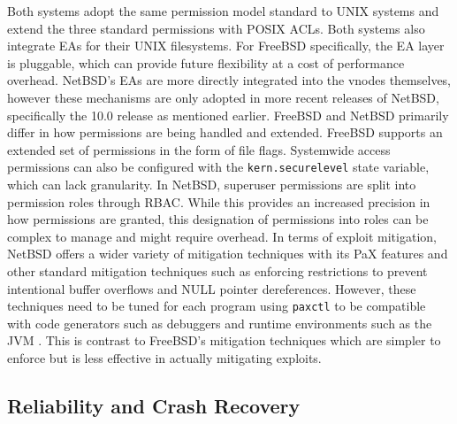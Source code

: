 Both systems adopt the same permission model standard to UNIX systems and extend the three standard permissions with POSIX ACLs.
Both systems also integrate EAs for their UNIX filesystems. For FreeBSD specifically, the EA layer is pluggable, which can provide
future flexibility at a cost of performance overhead. NetBSD's EAs are more directly integrated into the vnodes themselves,
however these mechanisms are only adopted in more recent releases of NetBSD, specifically the 10.0 release as mentioned earlier.
FreeBSD and NetBSD primarily differ in how permissions are being handled and extended. FreeBSD supports an extended set of permissions
in the form of file flags. Systemwide access permissions can also be configured with the \texttt{kern.securelevel} state variable,
which can lack granularity. In NetBSD, superuser permissions are split into permission roles through RBAC. While this provides an increased
precision in how permissions are granted, this designation of permissions into roles can be complex to manage and might require overhead.
In terms of exploit mitigation, NetBSD offers a wider variety of mitigation techniques with its PaX features and other standard
mitigation techniques such as enforcing restrictions to prevent intentional buffer overflows and NULL pointer dereferences.
However, these techniques need to be tuned for each program using \texttt{paxctl} to be compatible with code generators such as
debuggers and runtime environments such as the JVM \parencite{netbsd_paxctl}. This is contrast to FreeBSD's mitigation techniques
which are simpler to enforce but is less effective in actually mitigating exploits.

\subsection{Reliability and Crash Recovery} \label{reliability-and-crash-recovery} %

